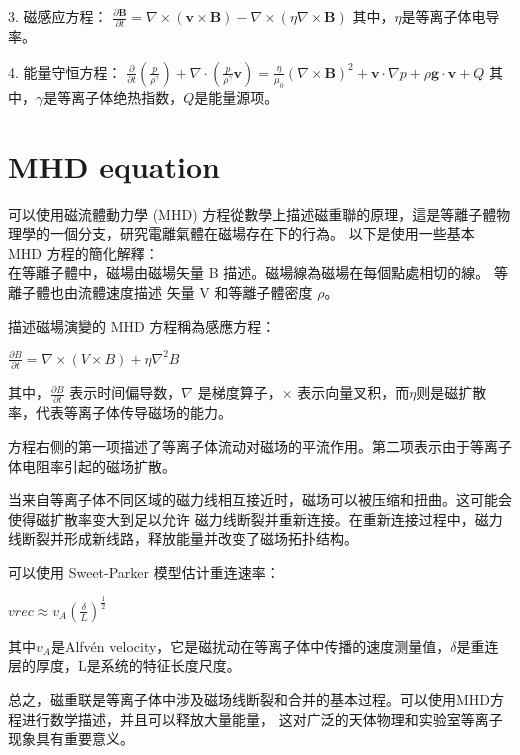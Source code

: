 \documentclass[12pt, a4paper, oneside]{article}
\begin{document}
\begin{spacing}{2.0}
3. 磁感应方程：
$\displaystyle \frac{\partial \mathbf{B}}{\partial t} = \nabla \times (\mathbf{v} \times \mathbf{B}) - \nabla \times (\eta \nabla \times \mathbf{B})$
其中，$\eta$是等离子体电导率。

4. 能量守恒方程：
$\displaystyle \frac{\partial}{\partial t} (\frac{p}{\rho^\gamma}) + \nabla \cdot (\frac{p}{\rho^\gamma} \mathbf{v}) = \frac{\eta}{\mu_0} (\nabla \times \mathbf{B})^2 + \mathbf{v} \cdot \nabla p + \rho \mathbf{g} \cdot \mathbf{v} + Q$
其中，$\gamma$是等离子体绝热指数，$Q$是能量源项。

\section{MHD equation}

可以使用磁流體動力學 (MHD) 方程從數學上描述磁重聯的原理，這是等離子體物理學的一個分支，研究電離氣體在磁場存在下的行為。
以下是使用一些基本 MHD 方程的簡化解釋：\\
在等離子體中，磁場由磁場矢量 B 描述。磁場線為磁場在每個點處相切的線。 等離子體也由流體速度描述
矢量 V 和等離子體密度 $\rho$。

描述磁場演變的 MHD 方程稱為感應方程：\begin{center}
    $\displaystyle\frac{\partial B}{\partial t} = \nabla\times (V\times B) + \eta \nabla^2 B$
\end{center}

其中，$\displaystyle\frac{\partial B}{\partial t}$ 表示时间偏导数，$\nabla$ 是梯度算子，$\times$ 表示向量叉积，而$\eta$则是磁扩散率，代表等离子体传导磁场的能力。

方程右侧的第一项描述了等离子体流动对磁场的平流作用。第二项表示由于等离子体电阻率引起的磁场扩散。

当来自等离子体不同区域的磁力线相互接近时，磁场可以被压缩和扭曲。这可能会使得磁扩散率变大到足以允许
磁力线断裂并重新连接。在重新连接过程中，磁力线断裂并形成新线路，释放能量并改变了磁场拓扑结构。

可以使用 Sweet-Parker 模型估计重连速率：
\begin{center}
    $\displaystyle vrec \approx v_A(\frac{\delta}{L})^{\frac{1}{2}}$
\end{center}

其中$v_A$是Alfvén velocity，它是磁扰动在等离子体中传播的速度测量值，$\delta$是重连层的厚度，L是系统的特征长度尺度。

总之，磁重联是等离子体中涉及磁场线断裂和合并的基本过程。可以使用MHD方程进行数学描述，并且可以释放大量能量，
这对广泛的天体物理和实验室等离子现象具有重要意义。


\end{spacing}
\end{document}

